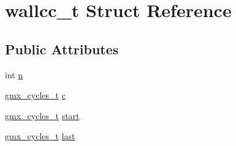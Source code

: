 \hypertarget{structwallcc__t}{\section{wallcc\-\_\-t \-Struct \-Reference}
\label{structwallcc__t}
}
\subsection*{\-Public \-Attributes}
\begin{DoxyCompactItemize}
\item 
int \hyperlink{structwallcc__t_a97149b622573f6fb03345b02f059bd62}{n}
\item 
\hyperlink{include_2gmx__cyclecounter_8h_a7b04e633389542df9f5535b05b873baa}{gmx\-\_\-cycles\-\_\-t} \hyperlink{structwallcc__t_a0c4022d025474b8421fee15aac110d80}{c}
\item 
\hyperlink{include_2gmx__cyclecounter_8h_a7b04e633389542df9f5535b05b873baa}{gmx\-\_\-cycles\-\_\-t} \hyperlink{structwallcc__t_a7362bf7db118cf1554ff10b547d8154f}{start}
\item 
\hyperlink{include_2gmx__cyclecounter_8h_a7b04e633389542df9f5535b05b873baa}{gmx\-\_\-cycles\-\_\-t} \hyperlink{structwallcc__t_af28e1664dc80ef396b6f3dde3e8c637b}{last}
\end{DoxyCompactItemize}


